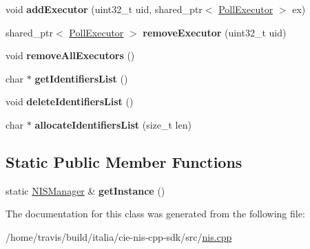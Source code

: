 \begin{DoxyCompactItemize}
\item 
\hypertarget{classNISManager_a40aeca3b6e971ecb75495e2eae06c967}{void {\bfseries add\-Executor} (uint32\-\_\-t uid, shared\-\_\-ptr$<$ \hyperlink{structPollExecutor}{Poll\-Executor} $>$ ex)}\label{classNISManager_a40aeca3b6e971ecb75495e2eae06c967}

\item 
\hypertarget{classNISManager_acf20b7ec02211ac1bc8e599ccf392517}{shared\-\_\-ptr$<$ \hyperlink{structPollExecutor}{Poll\-Executor} $>$ {\bfseries remove\-Executor} (uint32\-\_\-t uid)}\label{classNISManager_acf20b7ec02211ac1bc8e599ccf392517}

\item 
\hypertarget{classNISManager_a19037ce4d2614109b7086abdab6fad95}{void {\bfseries remove\-All\-Executors} ()}\label{classNISManager_a19037ce4d2614109b7086abdab6fad95}

\item 
\hypertarget{classNISManager_a713e9399922ebfdb0b5bbe5fee8f1bc3}{char $\ast$ {\bfseries get\-Identifiers\-List} ()}\label{classNISManager_a713e9399922ebfdb0b5bbe5fee8f1bc3}

\item 
\hypertarget{classNISManager_a56879726595d8357c09ecafe5cb074e3}{void {\bfseries delete\-Identifiers\-List} ()}\label{classNISManager_a56879726595d8357c09ecafe5cb074e3}

\item 
\hypertarget{classNISManager_ab55cd1e722e46885664f52eb883e2ead}{char $\ast$ {\bfseries allocate\-Identifiers\-List} (size\-\_\-t len)}\label{classNISManager_ab55cd1e722e46885664f52eb883e2ead}

\end{DoxyCompactItemize}
\subsection*{Static Public Member Functions}
\begin{DoxyCompactItemize}
\item 
\hypertarget{classNISManager_af6a7f2cb644fe38ef43b2ed9323506c7}{static \hyperlink{classNISManager}{N\-I\-S\-Manager} \& {\bfseries get\-Instance} ()}\label{classNISManager_af6a7f2cb644fe38ef43b2ed9323506c7}

\end{DoxyCompactItemize}


The documentation for this class was generated from the following file\-:\begin{DoxyCompactItemize}
\item 
/home/travis/build/italia/cie-\/nis-\/cpp-\/sdk/src/\hyperlink{nis_8cpp}{nis.\-cpp}\end{DoxyCompactItemize}
